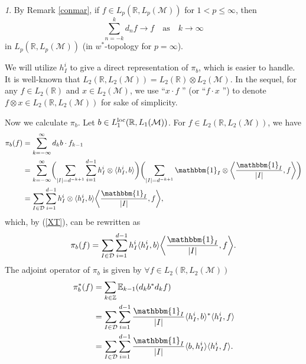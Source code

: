 \documentclass[oneside,english,a4wide]{amsart}
\numberwithin{equation}{section}
\numberwithin{figure}{section}
\theoremstyle{plain}
\theoremstyle{plain}
\theoremstyle{definition}
\theoremstyle{plain}
\theoremstyle{remark}
\newtheorem{rem}[thm]{\protect\remarkname}
\theoremstyle{definition}
\theoremstyle{remark}
\theoremstyle{definition}
\providecommand{\remarkname}{Remark}
\newcommand{\M}{{\mathcal M}}
\newcommand{\8}{\infty}
\begin{document}
\begin{rem}
	By Remark \ref{conmar}, if $f\in L_p(\mathbb{R}, L_p(\M))$ for $1<p\leq \8$, then
	$$   \sum_{n=-k}^k d_nf \longrightarrow f  \quad \text{as} \quad k\rightarrow\8  $$
	in $L_p(\mathbb{R}, L_p(\M))$ (in $w^*$-topology for $p=\8$).
\end{rem}

We will utilize $h_I^i$ to give a direct representation of $\pi_b$, which is easier to handle. It is well-known that $L_2(\mathbb{R},L_2(\mathcal{M}))=L_2(\mathbb{R})\otimes L_2(\mathcal{M})$. In the sequel, for any $f\in L_2(\mathbb{R})$ and $x\in L_2(\mathcal{M})$, we use ``$x\cdot f$ ''  (or ``$f\cdot x$ '') to denote $f\otimes x\in L_2(\mathbb{R},L_2(\mathcal{M}))$ for sake of simplicity.

Now we calculate $\pi_b$. Let $b\in  L_1^{\rm{loc}}(\mathbb{R}, L_1(\M))$. For $f\in L_2(\mathbb{R},L_2(\mathcal{M}))$, we have 
\begin{equation}\label{calcu}
	\begin{aligned}
		\pi_b(f){}&=\sum_{k=-\infty}^{\infty}d_kb\cdot f_{k-1}\\&=\sum_{k=-\infty}^{\infty}\biggl(\sum_{|I|=d^{-k+1}}\sum_{i=1}^{d-1}h_I^i\otimes\langle h_I^i,b\rangle\biggr)\biggl(\sum_{|I|=d^{-k+1}}\mathbbm{1}_I\otimes\biggl\langle \frac{\mathbbm{1}_I}{|I|},f\biggr\rangle\biggr)\\&=\sum_{I\in \mathcal{D}}\sum_{i=1}^{d-1}h^i_I\otimes\langle h_I^i,b\rangle \biggl\langle \frac{\mathbbm{1}_I}{|I|},f\biggr\rangle,
	\end{aligned}
\end{equation}
which, by (\ref{XT}), can be rewritten as
\begin{equation}\label{pib}
	\begin{aligned}
		\pi_b(f)=\sum_{I\in \mathcal{D}}\sum_{i=1}^{d-1}h^i_I\langle h_I^i,b\rangle \biggl\langle \frac{\mathbbm{1}_I}{|I|},f\biggr\rangle.
	\end{aligned}
\end{equation}
The adjoint operator of $\pi_b$ is given by $\forall f\in L_2(\mathbb{R},L_2(\mathcal{M}))$
\begin{equation}\label{pistar}
	\begin{aligned}
		\pi_b^*(f)&=\sum_{k\in\mathbb{Z}} \mathbb{E}_{k-1}(d_k b^* d_kf) \\
		&=\sum_{I\in \mathcal{D}}\sum_{i=1}^{d-1}\frac{\mathbbm{1}_I}{|I|}\langle h_I^i, b\rangle^* \langle h_I^i,f\rangle\\
		&=\sum_{I\in \mathcal{D}}\sum_{i=1}^{d-1}\frac{\mathbbm{1}_I}{|I|}\langle b,h_I^i\rangle \langle h_I^i,f\rangle. 
	\end{aligned}
\end{equation}
\end{document}
